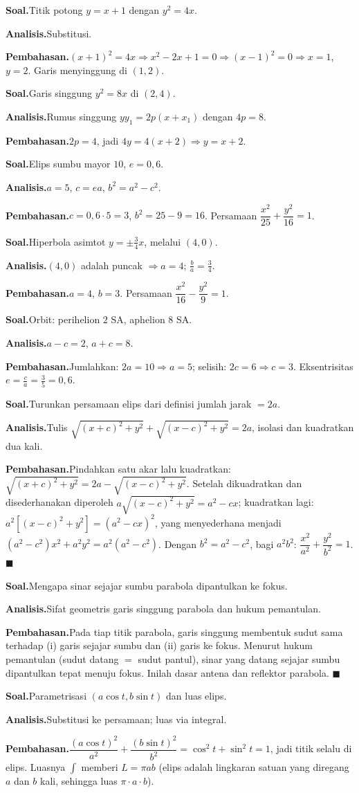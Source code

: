 \documentclass[11pt,a4paper]{report}
\theoremstyle{gaya}
\newcommand{\knomor}[1]{\par\medskip\noindent{\bfseries\color{ungu}#1}\par\nopagebreak}
\newcommand{\ksoal}{\noindent\textbf{\color{biru}Soal.}\space}
\newcommand{\kanalisis}{\par\noindent\textbf{\color{oranye}Analisis.}\space}
\newcommand{\kbahas}{\par\noindent\textbf{\color{hijau}Pembahasan.}\space}
\newcommand{\kbagian}[1]{\par\medskip\noindent{\large\bfseries\color{biru}#1}\par\smallskip}
\begin{document}
\knomor{C.2}
\ksoal Titik potong $y=x+1$ dengan $y^2=4x$.
\kanalisis Substitusi.
\kbahas $(x+1)^2=4x\Rightarrow x^2-2x+1=0\Rightarrow(x-1)^2=0\Rightarrow x=1$, $y=2$. Garis menyinggung di $(1,2)$.

\knomor{C.3}
\ksoal Garis singgung $y^2=8x$ di $(2,4)$.
\kanalisis Rumus singgung $yy_1=2p(x+x_1)$ dengan $4p=8$.
\kbahas $2p=4$, jadi $4y=4(x+2)\Rightarrow y=x+2$.

\knomor{C.4}
\ksoal Elips sumbu mayor $10$, $e=0{,}6$.
\kanalisis $a=5$, $c=ea$, $b^2=a^2-c^2$.
\kbahas $c=0{,}6\cdot5=3$, $b^2=25-9=16$. Persamaan $\dfrac{x^2}{25}+\dfrac{y^2}{16}=1$.

\knomor{C.5}
\ksoal Hiperbola asimtot $y=\pm\tfrac34x$, melalui $(4,0)$.
\kanalisis $(4,0)$ adalah puncak $\Rightarrow a=4$; $\tfrac ba=\tfrac34$.
\kbahas $a=4$, $b=3$. Persamaan $\dfrac{x^2}{16}-\dfrac{y^2}{9}=1$.

\knomor{C.6}
\ksoal Orbit: perihelion $2$ SA, aphelion $8$ SA.
\kanalisis $a-c=2$, $a+c=8$.
\kbahas Jumlahkan: $2a=10\Rightarrow a=5$; selisih: $2c=6\Rightarrow c=3$. Eksentrisitas $e=\tfrac ca=\tfrac35=0{,}6$.

\kbagian{Bagian D}

\knomor{D.1}
\ksoal Turunkan persamaan elips dari definisi jumlah jarak $=2a$.
\kanalisis Tulis $\sqrt{(x+c)^2+y^2}+\sqrt{(x-c)^2+y^2}=2a$, isolasi dan kuadratkan dua kali.
\kbahas Pindahkan satu akar lalu kuadratkan: $\sqrt{(x+c)^2+y^2}=2a-\sqrt{(x-c)^2+y^2}$. Setelah dikuadratkan dan disederhanakan diperoleh $a\sqrt{(x-c)^2+y^2}=a^2-cx$; kuadratkan lagi: $a^2[(x-c)^2+y^2]=(a^2-cx)^2$, yang menyederhana menjadi $(a^2-c^2)x^2+a^2y^2=a^2(a^2-c^2)$. Dengan $b^2=a^2-c^2$, bagi $a^2b^2$: $\dfrac{x^2}{a^2}+\dfrac{y^2}{b^2}=1$. $\blacksquare$

\knomor{D.2}
\ksoal Mengapa sinar sejajar sumbu parabola dipantulkan ke fokus.
\kanalisis Sifat geometris garis singgung parabola dan hukum pemantulan.
\kbahas Pada tiap titik parabola, garis singgung membentuk sudut sama terhadap (i) garis sejajar sumbu dan (ii) garis ke fokus. Menurut hukum pemantulan (sudut datang $=$ sudut pantul), sinar yang datang sejajar sumbu dipantulkan tepat menuju fokus. Inilah dasar antena dan reflektor parabola. $\blacksquare$

\knomor{D.3}
\ksoal Parametrisasi $(a\cos t,b\sin t)$ dan luas elips.
\kanalisis Substitusi ke persamaan; luas via integral.
\kbahas $\dfrac{(a\cos t)^2}{a^2}+\dfrac{(b\sin t)^2}{b^2}=\cos^2 t+\sin^2 t=1$, jadi titik selalu di elips. Luasnya $\displaystyle\int$ memberi $L=\pi ab$ (elips adalah lingkaran satuan yang diregang $a$ dan $b$ kali, sehingga luas $\pi\cdot a\cdot b$).
\end{document}
